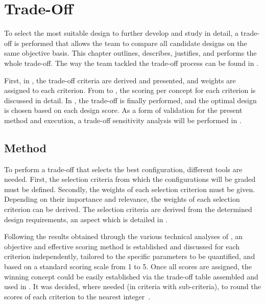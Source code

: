 \chapter{Trade-Off}
\label{ch:TradeOff}
To select the most suitable design to further develop and study in detail, a trade-off is performed that allows the team to compare all candidate designs on the same objective basis.
This chapter outlines, describes, justifies, and performs the whole trade-off.
The way the team tackled the trade-off process can be found in .

First, in , the trade-off criteria are derived and presented, and weights are assigned to each criterion.
From  to , the scoring per concept for each criterion is discussed in detail.
In , the trade-off is finally performed, and the optimal design is chosen based on each design score.
As a form of validation for the present method and execution, a trade-off sensitivity analysis will be performed in .



\section{Method}
\label{sec:TradeOffMethod}
To perform a trade-off that selects the best configuration, different tools are needed.
First, the selection criteria from which the configurations will be graded must be defined.
Secondly, the weights of each selection criterion must be given. 
Depending on their importance and relevance, the weights of each selection criterion can be derived.
The selection criteria are derived from the determined design requirements, an aspect which is detailed in .

Following the results obtained through the various technical analyses of , an objective and effective scoring method is established and discussed for each criterion independently, tailored to the specific parameters to be quantified, and based on a standard scoring scale from 1 to 5. 
Once all scores are assigned, the winning concept could be easily established via the trade-off table assembled and used in .
It was decided, where needed (in criteria with sub-criteria), to round the scores of each criterion to the nearest integer~\cite{dsePMSESlides1}.


